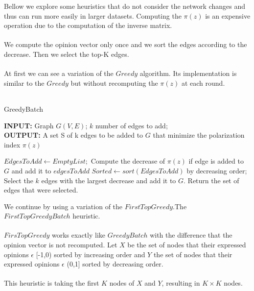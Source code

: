 Bellow we explore some heuristics that do not consider the network changes and thus can run more easily in larger datasets.
Computing the $\pi(z)$ is an expensive operation due to the computation of the inverse matrix. 
\\
\\
We compute the opinion vector only once and we sort the edges according to the decrease. Then we select the top-K edges.
\\
\\
At first we can see a variation of the $Greedy$ algorithm. Its implementation is similar to the $Greedy$ but without recomputing the  $\pi(z)$ at each round.
\\
\\
\begin{algorithm}[H]
		
			\caption{GreedyBatch}
			\label{alg:greedyBatch}
			
			\begin{flushleft}
        				\textbf{INPUT:} Graph $G(V, E)$; $k$ number of edges to add;
				\vspace{6pt}\\
        				\textbf{OUTPUT:} A set S of k edges to be added to $G$ that minimize the polarization \\ index $\pi(z)$
			\end{flushleft}
			
			\begin{algorithmic}[1]
				\STATE $EdgesToAdd \leftarrow Empty List;$
					\STATE Compute the decrease of $\pi(z)$ if edge is added to $G$ and add it to $edgesToAdd$
				\ENDFOR
				\STATE $Sorted \leftarrow sort(EdgesToAdd)$ by decreasing order;
				\STATE Select the $k$ edges with the largest decrease and add it to $G$.
				\STATE Return the set of edges that were selected.

			\end{algorithmic}
			
		\end{algorithm}

\vspace{10pt}
\clearpage


\noindent We continue by using a variation of the $FirstTopGreedy$.The $FirstTopGreedyBatch$ heuristic.
\\
\\
$FirsTopGreedy$  works exactly like $GreedyBatch$ with the difference that the opinion vector is not recomputed. Let $X$ be the set of nodes that their expressed opinions $\epsilon$ [-1,0) sorted by increasing order and $Y$ the set of nodes that their expressed opinions $\epsilon$ (0,1] sorted by decreasing order. 
\\
\\
This heuristic is taking the first $K$ nodes of $X$ and $Y$, resulting in $K \times K$ nodes.

